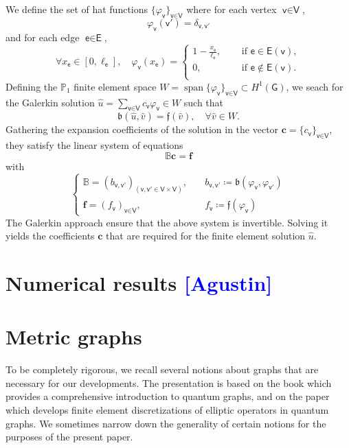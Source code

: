 \documentclass[11pt,a4paper,twoside]{article}
\theoremstyle{definition}
\numberwithin{equation}{section}
\newcommand{\bB}{\ensuremath{\mathbb{B}}}
\newcommand{\bP}{\ensuremath{\mathbb{P}}}
\newcommand{\G}{\ensuremath{\textsf{G}}} %
\newcommand{\E}{\ensuremath{\textsf{E}}} %
\newcommand{\V}{\ensuremath{\textsf{V}}} %
\newcommand{\vv}{\ensuremath{\textsf{v}}}
\newcommand{\ee}{\ensuremath{\textsf{e}}}
\newcommand{\<}{\langle}
\renewcommand{\>}{\rangle}
\newcommand{\vspan}{\operatorname{span}}
\newcommand{\om}[1]{\textcolor{blue}{#1}}
\begin{document}
We define the set of hat functions $\{\varphi_\vv\}_{\vv\in \V}$ where for each vertex $\vv\in \V$,
$$
\varphi_\vv( \vv') = \delta_{\vv, \vv'}
$$
and for each edge $\ee \in \E$,
\begin{equation}
\forall x_\ee \in [0, \ell_\ee],\quad
\varphi_\vv(x_\ee)=
\begin{cases}
1-\frac{x_\ee}{\ell_\ee}, \quad &\text{ if } \ee \in \E(\vv), \\
0 , \quad &\text{ if } \ee \not\in \E(\vv). \\
\end{cases}
\end{equation}
Defining the $\bP_1$ finite element space $W = \vspan\{\varphi_\vv\}_{\vv\in \V} \subset H^1(\G)$, we seach for the Galerkin solution $\hat u = \sum_{\vv\in \V} c_\vv \varphi_\vv \in W$ such that
$$
\mathfrak{b}(\hat u, \hat v) = \mathfrak{f} (\hat v), \quad \forall \hat v\in W.
$$
Gathering the expansion coefficients of the solution in the vector $\textbf{c} = \{c_\vv\}_{\vv\in \V}$, they satisfy the linear system of equations
$$
\bB\textbf{c} = \textbf{f}
$$
with
\begin{equation}
\begin{cases}
\bB = (b_{\vv, \vv'})_{(\vv,\vv'\in \V \times \V)}, \quad &b_{\vv, \vv'} \coloneqq \mathfrak{b}(\varphi_\vv, \varphi_{\vv'}) \\
\textbf{f} = (f_\vv)_{\vv\in \V}, \quad &f_\vv \coloneqq \mathfrak{f}(\varphi_\vv)
\end{cases}
\end{equation}
The Galerkin approach ensure that the above system is invertible. Solving it yields the coefficients $\textbf{c}$ that are required for the finite element solution $\hat u$.








\section{Numerical results \om{[Agustin]}}
\label{sec:numerical-tests}



\appendix
\section{Metric graphs}
\label{sec:metric-graphs}
To be completely rigorous, we recall several notions about graphs that are necessary for our developments. The presentation is based on the book \cite{BK2013} which provides a comprehensive introduction to quantum graphs, and on the paper \cite{AB2018} which develops finite element discretizations of elliptic operators in quantum graphs. We sometimes narrow down the generality of certain notions for the purposes of the present paper.
\end{document}
